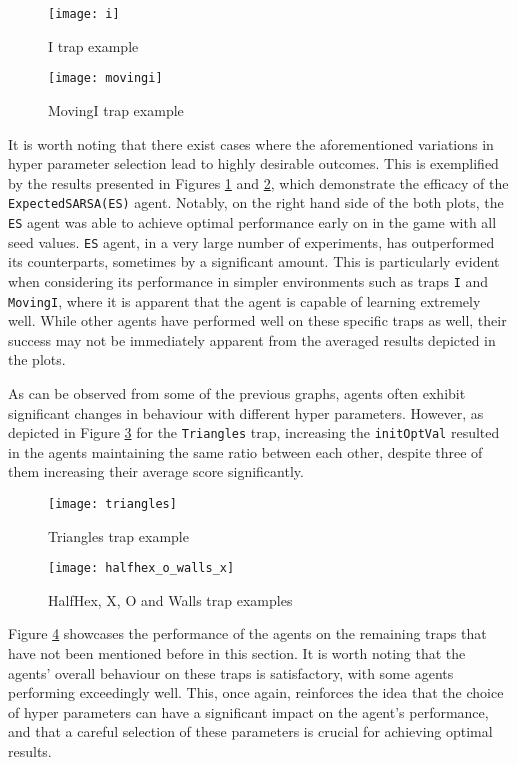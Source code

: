 \begin{figure}[h]
    \centering
    \texttt{[image: i]}
    \caption{I trap example}
    \label{fig:i_eg}
\end{figure}

\begin{figure}[h]
    \centering
    \texttt{[image: movingi]}
    \caption{MovingI trap example}
    \label{fig:movingi_eg}
\end{figure}


It is worth noting that there exist cases where the aforementioned variations in hyper parameter selection lead to highly desirable outcomes. This is exemplified by the results presented in Figures \ref{fig:i_eg} and \ref{fig:movingi_eg}, which demonstrate the efficacy of the \texttt{ExpectedSARSA(ES)} agent. Notably, on the right hand side of the both plots, the \texttt{ES} agent was able to achieve optimal performance early on in the game with all seed values. \texttt{ES} agent, in a very large number of experiments, has outperformed its counterparts, sometimes by a significant amount. This is particularly evident when considering its performance in simpler environments such as traps \texttt{I} and \texttt{MovingI}, where it is apparent that the agent is capable of learning extremely well. While other agents have performed well on these specific traps as well, their success may not be immediately apparent from the averaged results depicted in the plots.

As can be observed from some of the previous graphs, agents often exhibit significant changes in behaviour with different hyper parameters. However, as depicted in Figure \ref{fig:triangles_eg} for the \texttt{Triangles} trap, increasing the \texttt{initOptVal} resulted in the agents maintaining the same ratio between each other, despite three of them increasing their average score significantly.

\begin{figure}[h]
    \centering
    \texttt{[image: triangles]}
    \caption{Triangles trap example}
    \label{fig:triangles_eg}
\end{figure}

\begin{figure}[h]
    \centering
    \texttt{[image: halfhex\_o\_walls\_x]}
    \caption{HalfHex, X, O and Walls trap examples}
    \label{fig:halfhex_o_walls_x_eg}
\end{figure}

Figure \ref{fig:halfhex_o_walls_x_eg} showcases the performance of the agents on the remaining traps that have not been mentioned before in this section. It is worth noting that the agents' overall behaviour on these traps is satisfactory, with some agents performing exceedingly well. This, once again, reinforces the idea that the choice of hyper parameters can have a significant impact on the agent's performance, and that a careful selection of these parameters is crucial for achieving optimal results.

